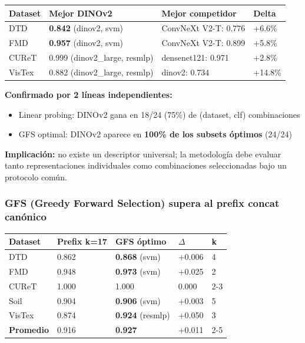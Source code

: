 \begin{table}[h]
\centering
\begin{tabular}{llll}
\toprule
Dataset & Mejor DINOv2 & Mejor competidor & Delta \\
\midrule
DTD & \textbf{0.842} (dinov2, svm) & ConvNeXt V2-T: 0.776 & +6.6\% \\
FMD & \textbf{0.957} (dinov2, svm) & ConvNeXt V2-T: 0.899 & +5.8\% \\
CUReT & 0.999 (dinov2\_large, resmlp) & densenet121: 0.971 & +2.8\% \\
VisTex & 0.882 (dinov2\_large, resmlp) & dinov2: 0.734 & +14.8\% \\
\bottomrule
\end{tabular}
\end{table}

\textbf{Confirmado por 2 líneas independientes:}
\begin{itemize}
  \item Linear probing: DINOv2 gana en 18/24 (75\%) de (dataset, clf) combinaciones
  \item GFS optimal: DINOv2 aparece en \textbf{100\% de los subsets óptimos} (24/24)
\end{itemize}

\textbf{Implicación:} no existe un descriptor universal; la metodología debe evaluar tanto representaciones individuales como combinaciones seleccionadas bajo un protocolo común.

\subsubsection{GFS (Greedy Forward Selection) supera al prefix concat canónico}

\begin{table}[h]
\centering
\begin{tabular}{lllll}
\toprule
Dataset & Prefix k=17 & \textbf{GFS óptimo} & $\Delta$ & k \\
\midrule
DTD & 0.862 & \textbf{0.868} (svm) & +0.006 & 4 \\
FMD & 0.948 & \textbf{0.973} (svm) & +0.025 & 2 \\
CUReT & 1.000 & 1.000 & 0.000 & 2-3 \\
Soil & 0.904 & \textbf{0.906} (svm) & +0.003 & 5 \\
VisTex & 0.874 & \textbf{0.924} (resmlp) & +0.050 & 3 \\
\textbf{Promedio} & 0.916 & \textbf{0.927} & +0.011 & 2-5 \\
\bottomrule
\end{tabular}
\end{table}

